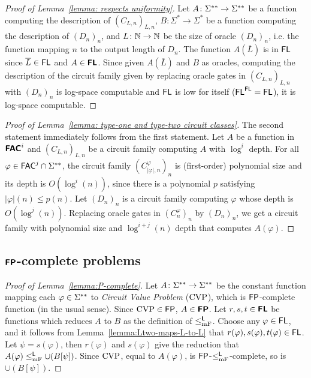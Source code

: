 \documentclass[a4paper,UKenglish]{lipics}
\begin{document}
\begin{proof}[Proof of Lemma~\ref{lemma: respects uniformity}]
 Let $A \colon \Sigma ^{**} \to \Sigma ^{**}$ be a function computing the description of $(C_{L,n})_{L,n}$,
 $B \colon \Sigma^* \to \Sigma^*$ be a function computing the description of $(D_n)_n$, and
 $L \colon \mathbb N \to \mathbb N$ be the size of oracle $(D_n)_n$, i.e.
 the function mapping $n$ to the output length of $D_n$.
 The function $A(\overline{L})$ is in $\mathsf{FL}$ since $\overline{L} \in \mathsf{FL}$ and $A \in \text{\bfseries \sffamily \upshape FL}$.
 Since given $A(\overline{L})$ and $B$ as oracles,
 computing the description of the circuit family given by replacing oracle
 gates in $(C_{L,n})_{L,n}$ with $(D_n)_n$ is log-space computable
 and $\mathsf{FL}$ is low for itself ($\mathsf{FL}^{\mathsf{FL}} = \mathsf{FL}$),
 it is log-space computable.
\end{proof}

\begin{proof}[Proof of Lemma~\ref{lemma: type-one and type-two circuit classes}]
The second statement immediately follows from the first statement.
Let $A$ be a function in $\text{\bfseries \sffamily \upshape FAC}^i$ and $(C_{L,n})_{L,n}$ be a circuit
family computing $A$ with $\log^i$ depth.
For all $\varphi \in \mathsf{FAC}^j \cap \Sigma ^{**}$, 
the circuit family $(C^\varphi_{|\varphi|,n})_n$ is (first-order) polynomial size and its depth is $O(\log^i(n))$,
since there is a polynomial $p$ satisfying $|\varphi|(n) \le p(n)$.
Let $(D_n)_n$ is a circuit family computing $\varphi$ whose depth is $O(\log^j(n))$.
Replacing oracle gates in $(C^\varphi_n)_n$ by $(D_n)_n$, 
we get a circuit family with polynomial size and $\log^{i+j}(n)$ depth
that computes $A(\varphi)$.
\end{proof}

\subsection{$\text{\bfseries \sffamily \upshape FP}$-complete problems}

\begin{proof}[Proof of Lemma~\ref{lemma:P-complete}]
Let $A \colon \Sigma ^{**} \to \Sigma ^{**}$ be the constant function mapping each $\varphi \in \Sigma ^{**}$ to \emph{Circuit Value Problem} ($\mathrm{CVP}$), which is $\mathsf{FP}$-complete function (in the usual sense).
Since $\mathrm{CVP} \in \mathsf{FP}$, $A \in \text{\bfseries \sffamily \upshape FP}$.
Let $r, s, t \in \text{\bfseries \sffamily \upshape FL}$ be functions which reduces $A$ to $B$
as the definition of $\leq _{\mathrm{mF}} ^{\text{\bfseries \sffamily \upshape L}}$.
Choose any $\varphi \in \mathsf{FL}$, and it follows from Lemma~\ref{lemma:Ltwo-maps-L-to-L}
that $r(\varphi), s(\varphi), t(\varphi) \in \mathsf{FL}$.
Let $\psi = s(\varphi)$, then $r(\varphi)$ and $s(\varphi)$ give the reduction that
$A(\varphi) \leq _{\mathrm{mF}}^{\mathsf{L}} \cup (B[\psi])$.
Since $\mathrm{CVP}$, equal to $A(\varphi)$, is $\mathsf{FP}$-$\leq _{\mathrm{mF}}^{\mathsf{L}}$-complete,
so is $\cup (B[\psi])$.
\end{proof}
\end{document}
